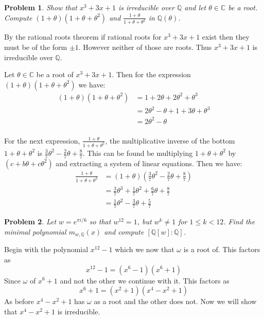 \documentclass[10pt]{article}
\newcommand{\sk}{\vskip 10mm}
\newcommand{\bb}[1]{\mathbb{#1}}
\theoremstyle{plain}
\newtheorem{problem}{Problem}
\theoremstyle{remark}
\begin{document}
\begin{problem}
  Show that $x^3 + 3x+1$ is irreducible over $\mathbb{Q}$ and let
  $\theta \in \mathbb{C}$ be a root. Compute $(1 + \theta)(1+\theta+\theta^2)$
  and $\frac{1 + \theta}{1 + \theta + \theta^2}$ in $\mathbb{Q}(\theta)$.
\end{problem}

By the rational roots theorem if rational roots for $x^3+3x+1$ exist
then they must be of the form $\pm 1$. However neither of those are
roots. Thus $x^3+3x+1$ is irreducible over $\bb{Q}$.

Let $\theta\in\bb{C}$ be a root of $x^3+3x+1$.
Then for the expression $(1+\theta)(1+\theta+\theta^2)$ we have:
\begin{align*}
  (1+\theta)(1+\theta+\theta^2) &= 1+2\theta+2\theta^2+\theta^3\\
                &= 2\theta^2-\theta +1+3\theta+\theta^3\\
                &= 2\theta^2-\theta\\
\end{align*}

For the next expression, $\frac{1+\theta}{1+\theta+\theta^2}$, the multiplicative inverse
of the bottom $1+\theta+\theta^2$ is $\frac{3}{7}\theta^2-\frac{2}{7}\theta+\frac{8}{7}$. This
can be found be multiplying $1+\theta+\theta^2$ by $(c+b\theta+c\theta^2)$ and extracting a system
of linear equations. Then we have:
\begin{align*}
  \frac{1+\theta}{1+\theta+\theta^2} &= (1+\theta)\left(\frac{3}{7}\theta^2-\frac{2}{7}\theta+\frac{8}{7}\right)\\
                     &= \frac{3}{7} \theta^{3} + \frac{1}{7} \theta^{2} + \frac{6}{7} \theta + \frac{8}{7}\\
                     &= \frac{1}{7} \theta^{2} - \frac{3}{7} \theta + \frac{5}{7}
\end{align*}

\sk

\begin{problem}
  Let $w = e^{\pi i /6}$ so that $w^{12} = 1$, but $w^k \neq 1$
  for $1 \leq k < 12$. Find the minimal polynomial $m_{w,\mathbb{Q}}(x)$
  and compute $[\mathbb{Q}[w]:\mathbb{Q}]$.
\end{problem}

Begin with the polynomial $x^{12}-1$ which we now that $\omega$ is a root of. This
factors as
\[ x^{12}-1=(x^6-1)(x^6+1) \]
Since $\omega$ of $x^6+1$ and not the other we continue with it. This factors as
\[ x^6+1=(x^2+1)(x^4-x^2+1)\]
As before $x^4-x^2+1$ has $\omega$ as a root and the other does not.
Now we will show that $x^4-x^2+1$ is irreducible.
\end{document}
